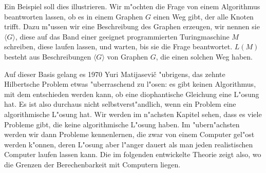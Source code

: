Ein Beispiel soll dies illustrieren. Wir m"ochten die Frage
von einem Algorithmus beantworten lassen, ob es in einem Graphen $G$
einen Weg gibt, der alle Knoten trifft.  Dazu m"ussen wir eine
Beschreibung des Graphen erzeugen, wir nennen sie $\langle G\rangle$,
diese auf das Band einer geeignet programmierten Turingmaschine $M$ schreiben,
diese laufen lassen, und warten, bis sie die Frage beantwortet. $L(M)$
besteht aus Beschreibungen $\langle G\rangle$ von Graphen $G$, die
einen solchen Weg haben.

Auf dieser Basis gelang es 1970 Yuri Matijasevi\v c "ubrigens,
das zehnte Hilbertsche Problem etwas "uberraschend zu l"osen: es gibt
keinen Algorithmus, mit dem entschieden werden kann, ob eine
diophantische Gleichung eine L"osung hat. Es ist also durchaus
nicht selbstverst"andlich, wenn ein Problem eine algorithmische
L"osung hat. Wir werden im n"achsten Kapitel sehen, dass es viele
Probleme gibt, die keine algorithmische L"osung haben. Im "ubern"achsten
werden wir dann Probleme kennenlernen, die zwar von einem Computer
gel"ost werden k"onnen, deren L"osung aber l"anger dauert als man
jeden realistischen Computer laufen lassen kann.
Die im folgenden entwickelte Theorie zeigt also, wo die Grenzen
der Berechenbarkeit mit Computern liegen.
